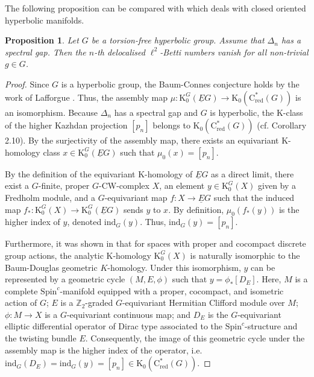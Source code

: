 \documentclass[a4paper,leqno,12pt]{article}
\numberwithin{equation}{section}
\theoremstyle{plain}
\newtheorem{proposition}[theoremcounter]{Proposition}
\theoremstyle{definition}
\theoremstyle{remark}
\newcommand{\Csr}{\mathrm{C}^*_{\text{red}}}
\begin{document}
	The following proposition can be compared with \cite[Proposition 9]{lott1999} which deals with closed oriented hyperbolic manifolds.
	
	\begin{proposition}
		\label{prop:torfreehyper}
		Let $G$ be a torsion-free hyperbolic group. 
		Assume that $\Delta_n$ has a spectral gap.
		Then the $n$-th delocalised $\ell^2$-Betti numbers vanish for all non-trivial $g\in G$.
	\end{proposition}

\begin{proof}
Since $G$ is a hyperbolic group, the Baum-Connes conjecture holds by the work of Lafforgue \cite{lafforgue2002}. Thus, the assembly map $\mu: \mathrm K_0^G(\underline{E}G) \to \mathrm K_0(\Csr(G))$ is an isomorphism. Because $\Delta_n$ has a spectral gap and $G$ is hyperbolic, the K-class of the higher Kazhdan projection $[p_n]$ belongs to $\mathrm K_0(\Csr(G))$ (cf. Corollary 2.10). By the surjectivity of the assembly map, there exists an equivariant K-homology class $x \in \mathrm K_0^G(\underline{E}G)$ such that $\mu_0(x) = [p_n]$. 

By the definition of the equivariant K-homology of $\underline{E}G$ as a direct limit, there exist a $G$-finite, proper $G$-CW-complex $X$, an element $y\in \mathrm K_0^G(X)$ given by a Fredholm module, and a $G$-equivariant map $f: X\rightarrow \underline{E}G$ such that the induced map $f_*: \mathrm K_0^G(X)\rightarrow \mathrm K_0^G(\underline{E}G)$ sends $y$ to $x$. By definition, $\mu_0(f_*(y))$ is the higher index of $y$, denoted $\mathrm{ind}_G(y)$. Thus, $\mathrm{ind}_G(y)=[p_n]$.  

Furthermore, it was shown in \cite{BaumHigsonSchick2010} that for spaces with proper and cocompact discrete group actions, the analytic K-homology $\mathrm K_0^G(X)$ is naturally isomorphic to the Baum-Douglas geometric $K$-homology. Under this isomorphism, $y$ can be represented by a geometric cycle $(M, E, \phi)$ such that $y=\phi_*[D_E]$. Here, $M$ is a complete $\mathrm{Spin}^c$-manifold equipped with a proper, cocompact, and isometric action of $G$; $E$ is a $\mathbb{Z}_2$-graded $G$-equivariant Hermitian Clifford module over $M$; $\phi: M\rightarrow X$ is a $G$-equivariant continuous map; and $D_E$ is the $G$-equivariant elliptic differential operator of Dirac type associated to the $\mathrm{Spin}^c$-structure and the twisting bundle $E$. Consequently, the image of this geometric cycle under the assembly map is the higher index of the operator, i.e. $\mathrm{ind}_G(D_E)=\mathrm{ind}_G(y) = [p_n] \in \mathrm K_0(\Csr(G))$. 


\end{proof}
\end{document}
